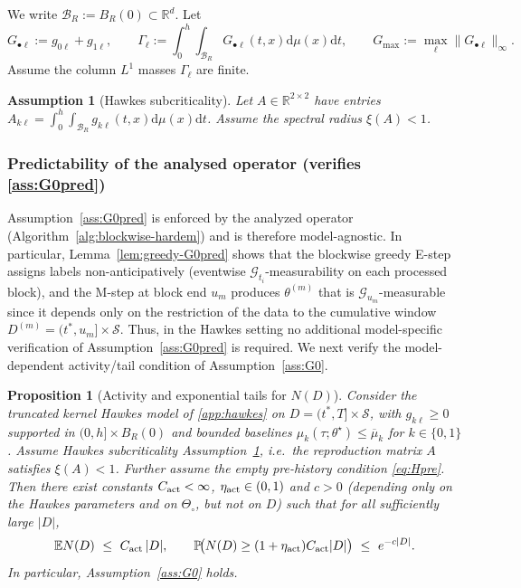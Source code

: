 \documentclass{statsoc}
\newtheorem{proposition}[proposition]{Proposition}
\newtheorem{assumption}[assumption]{Assumption}
\newcommand{\bbE}{\mathbb{E}}
\newcommand{\bbP}{\mathbb{P}}
\newcommand{\dd}{\mathrm{d}}
\newcommand{\bbR}{\mathbb{R}}
\newcommand{\1}{\mathbbm{1}}
\begin{document}
We write \(\mathcal B_R:=B_R(0)\subset\bbR^d\). Let
\[
G_{\bullet\ell}:=g_{0\ell}+g_{1\ell},\qquad
\Gamma_\ell:=\int_0^h\!\!\int_{\mathcal B_R} G_{\bullet\ell}(t,x) \dd\mu(x)\dd t,\qquad
G_{\max}:=\max_\ell \|G_{\bullet\ell}\|_\infty.
\]
Assume the column $L^1$ masses $\Gamma_\ell$ are finite.

\begin{assumption}[Hawkes subcriticality]\label{ass:H-stab}
Let $A\in\bbR^{2\times 2}$ have entries $A_{k\ell}=\int_0^h\!\!\int_{\mathcal B_R} g_{k\ell}(t,x) \dd\mu(x)\dd t$. Assume the spectral radius $\xi(A)<1$.
\end{assumption}

\subsubsection{Predictability of the analysed operator (verifies \cref{ass:G0pred})}

Assumption~\ref{ass:G0pred} is enforced by the analyzed operator (Algorithm~\ref{alg:blockwise-hardem}) and is therefore model-agnostic.
In particular, Lemma~\ref{lem:greedy-G0pred} shows that the blockwise greedy E-step assigns labels non-anticipatively (eventwise $\mathcal G_{t_i}$-measurability on each processed block), and the M-step at block end $u_m$ produces $\theta^{(m)}$ that is $\mathcal G_{u_m}$-measurable since it depends only on the restriction of the data to the cumulative window $D^{(m)}=(t^\ast,u_m]\times\mathcal S$.
Thus, in the Hawkes setting no additional model-specific verification of Assumption~\ref{ass:G0pred} is required.
We next verify the model-dependent activity/tail condition of Assumption~\ref{ass:G0}.

\begin{proposition}[Activity and exponential tails for $N(D)$]
\label{prop:hawkes-G0}
Consider the truncated kernel Hawkes model of \cref{app:hawkes} on $D=(t^\ast,T]\times \mathcal{S}$, with $g_{k\ell}\ge 0$ supported in $(0,h]\times B_R(0)$ and bounded baselines $\mu_k(\tau;\theta^\star)\le \overline\mu_k$ for $k\in\{0,1\}$. Assume Hawkes subcriticality Assumption~\ref{ass:H-stab}, i.e.\ the reproduction matrix $A$ satisfies $\xi(A)<1$. Further assume the empty pre-history condition \eqref{eq:Hpre}. Then there exist constants $C_{\rm act}<\infty$, $\eta_{\rm act}\in(0,1)$ and $c>0$ (depending only on the Hawkes parameters and on $\Theta_\circ$, but not on $D$) such that for all sufficiently large $|D|$,
\[
\bbE N(D)\ \le\ C_{\rm act}\,|D|,
\qquad
\bbP\!\big(N(D)\ge (1+\eta_{\rm act})C_{\rm act}|D|\big)\ \le\ e^{-c|D|}.
\]
In particular, Assumption~\ref{ass:G0} holds.
\end{proposition}
\end{document}
